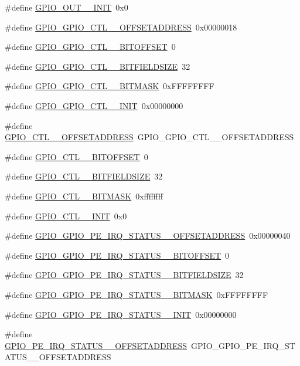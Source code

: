 \begin{DoxyCompactItemize}
\item 
\#define \hyperlink{a00553_a123f41f6c9f3350f1a4cda6ab71e636f}{GPIO\_\-OUT\_\_\-INIT}~0x0
\item 
\#define \hyperlink{a00553_a7068ff42e1189e5781989b988c52a794}{GPIO\_\-GPIO\_\-CTL\_\_\-OFFSETADDRESS}~0x00000018
\item 
\#define \hyperlink{a00553_a66f6d7f5013e564a5ad67e4feeb35196}{GPIO\_\-GPIO\_\-CTL\_\_\-BITOFFSET}~0
\item 
\#define \hyperlink{a00553_a6ada7fa71d0a72c646880b9dba550057}{GPIO\_\-GPIO\_\-CTL\_\_\-BITFIELDSIZE}~32
\item 
\#define \hyperlink{a00553_a46e73f3281176c81ee18096d18b654bc}{GPIO\_\-GPIO\_\-CTL\_\_\-BITMASK}~0xFFFFFFFF
\item 
\#define \hyperlink{a00553_abf5aba2a58979ad93aee20628873c627}{GPIO\_\-GPIO\_\-CTL\_\_\-INIT}~0x00000000
\item 
\#define \hyperlink{a00553_a3f785a80b762b43c1d9041f53e1961fa}{GPIO\_\-CTL\_\_\-OFFSETADDRESS}~GPIO\_\-GPIO\_\-CTL\_\_\-OFFSETADDRESS
\item 
\#define \hyperlink{a00553_ad5144dff63728f84107c63df4ca00501}{GPIO\_\-CTL\_\_\-BITOFFSET}~0
\item 
\#define \hyperlink{a00553_a6adbeda65f78e3332570cc15358cfd57}{GPIO\_\-CTL\_\_\-BITFIELDSIZE}~32
\item 
\#define \hyperlink{a00553_a881d68236f50a224ed69bfd6f86818d9}{GPIO\_\-CTL\_\_\-BITMASK}~0xffffffff
\item 
\#define \hyperlink{a00553_a981704258561a20df965327d225871f8}{GPIO\_\-CTL\_\_\-INIT}~0x0
\item 
\#define \hyperlink{a00553_a39bf966b3adf27c31749ed567c902205}{GPIO\_\-GPIO\_\-PE\_\-IRQ\_\-STATUS\_\_\-OFFSETADDRESS}~0x00000040
\item 
\#define \hyperlink{a00553_ad5a6c8b3c6b9e10d116c92c0f46c34e3}{GPIO\_\-GPIO\_\-PE\_\-IRQ\_\-STATUS\_\_\-BITOFFSET}~0
\item 
\#define \hyperlink{a00553_afceee58d349f20e83de943ce7c499f8a}{GPIO\_\-GPIO\_\-PE\_\-IRQ\_\-STATUS\_\_\-BITFIELDSIZE}~32
\item 
\#define \hyperlink{a00553_a88b9c6f16ae60966127080359af2bc5c}{GPIO\_\-GPIO\_\-PE\_\-IRQ\_\-STATUS\_\_\-BITMASK}~0xFFFFFFFF
\item 
\#define \hyperlink{a00553_a485095304fde28793269f8d6bcc25ab3}{GPIO\_\-GPIO\_\-PE\_\-IRQ\_\-STATUS\_\_\-INIT}~0x00000000
\item 
\#define \hyperlink{a00553_ae7f2c14a3ec9beda59acf0bd4b434b2e}{GPIO\_\-PE\_\-IRQ\_\-STATUS\_\_\-OFFSETADDRESS}~GPIO\_\-GPIO\_\-PE\_\-IRQ\_\-STATUS\_\_\-OFFSETADDRESS

\end{DoxyCompactItemize}
